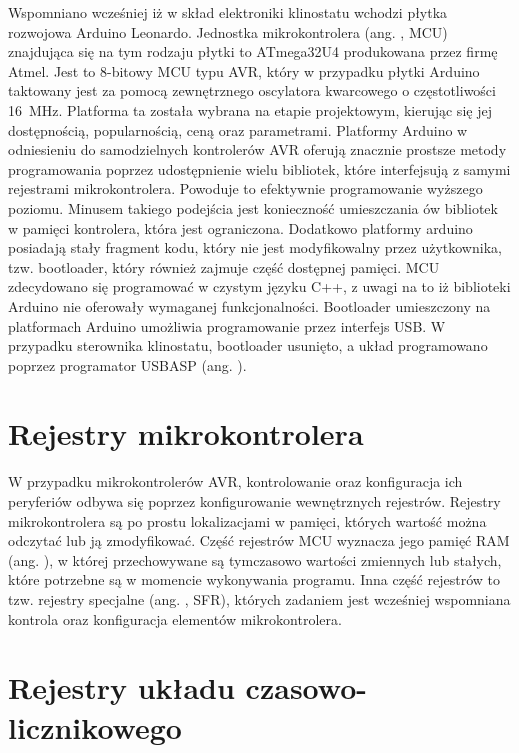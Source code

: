 Wspomniano wcześniej iż w skład elektroniki klinostatu wchodzi płytka rozwojowa Arduino Leonardo. Jednostka mikrokontrolera (ang. , MCU) znajdująca się na tym rodzaju płytki to ATmega32U4 produkowana przez firmę Atmel. Jest to 8-bitowy MCU typu AVR, który w przypadku płytki Arduino taktowany jest za pomocą zewnętrznego oscylatora kwarcowego o częstotliwości \SI{16}{MHz}. Platforma ta została wybrana na etapie projektowym, kierując się jej dostępnością, popularnością, ceną oraz parametrami. Platformy Arduino w odniesieniu do samodzielnych kontrolerów AVR oferują znacznie prostsze metody programowania poprzez udostępnienie wielu bibliotek, które interfejsują z samymi rejestrami mikrokontrolera. Powoduje to efektywnie programowanie wyższego poziomu. Minusem takiego podejścia jest konieczność umieszczania ów bibliotek w pamięci kontrolera, która jest ograniczona. Dodatkowo platformy arduino posiadają stały fragment kodu, który nie jest modyfikowalny przez użytkownika, tzw. bootloader, który również zajmuje część dostępnej pamięci. MCU zdecydowano się programować w czystym języku C++, z uwagi na to iż biblioteki Arduino nie oferowały wymaganej funkcjonalności. Bootloader umieszczony na platformach Arduino umożliwia programowanie przez interfejs USB. W przypadku sterownika klinostatu, bootloader usunięto, a układ programowano poprzez programator USBASP (ang. ).

\section{Rejestry mikrokontrolera}

W przypadku mikrokontrolerów AVR, kontrolowanie oraz konfiguracja ich peryferiów odbywa się poprzez konfigurowanie wewnętrznych rejestrów. Rejestry mikrokontrolera są po prostu lokalizacjami w pamięci, których wartość można odczytać lub ją zmodyfikować. Część rejestrów MCU wyznacza jego pamięć RAM (ang. ), w której przechowywane są tymczasowo wartości zmiennych lub stałych, które potrzebne są w momencie wykonywania programu. Inna część rejestrów to tzw. rejestry specjalne (ang. , SFR), których zadaniem jest wcześniej wspomniana kontrola oraz konfiguracja elementów mikrokontrolera.

\section{Rejestry układu czasowo-licznikowego}

